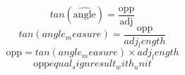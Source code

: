 \[tan(\widehat{{\text{{{angle}}}}})=\frac{{\text{{{opp}}}}}{{\text{{{adj}}}}}\]
\[tan({angle_measure})=\frac{\text{{{opp}}}}{{{adj_length}}}\]
\[\text{{{opp}}}=tan({angle_measure})\times {adj_length}\]
\[\text{{{opp}}}{equal_sign}{result_with_unit}\]
